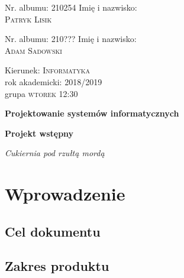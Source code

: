 \documentclass[14pt,a4paper]{article}
\begin{document}
\begin{titlepage}

\begin{minipage}{0.33 \textwidth}
\begin{flushleft}
\large
Nr. albumu: \textsc{210254}\linebreak
Imię i nazwisko:\\
\textsc{Patryk Lisik}
\end{flushleft}
\end{minipage}
\hspace{0.2\textwidth}
\begin{minipage}{0.33 \textwidth}
\begin{flushleft}
\large
Nr. albumu: \textsc{210???}\linebreak
Imię i nazwisko:\\
\textsc{Adam Sadowski}
\end{flushleft}
\end{minipage}

\vspace{3cm}
\begin{minipage}{0.5\textwidth}
\begin{flushleft}
\Large
Kierunek: \textsc{Informatyka} \\
rok akademicki: \textsc{2018/2019} \\
grupa \textsc{wtorek 12:30} \linebreak\linebreak
\end{flushleft}
\end{minipage}

\vspace{3cm}

{\center\huge\bfseries Projektowanie systemów informatycznych \par}
\vspace{1.5cm}
{\center\huge\bfseries Projekt wstępny \par}
{\center\Large\itshape Cukiernia pod rzułtą mordą\par}

\end{titlepage}
\section{Wprowadzenie}
\subsection{Cel dokumentu}
\subsection{Zakres produktu}
\end{document}
